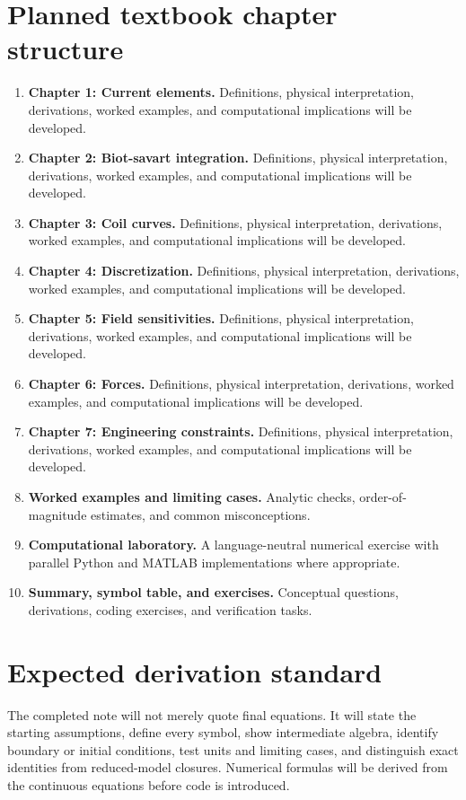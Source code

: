 \documentclass[11pt]{article}
\begin{document}
\section{Planned textbook chapter structure}
\begin{enumerate}[leftmargin=1.8em]
\item \textbf{Chapter 1: Current elements.} Definitions, physical interpretation, derivations, worked examples, and computational implications will be developed.
\item \textbf{Chapter 2: Biot-savart integration.} Definitions, physical interpretation, derivations, worked examples, and computational implications will be developed.
\item \textbf{Chapter 3: Coil curves.} Definitions, physical interpretation, derivations, worked examples, and computational implications will be developed.
\item \textbf{Chapter 4: Discretization.} Definitions, physical interpretation, derivations, worked examples, and computational implications will be developed.
\item \textbf{Chapter 5: Field sensitivities.} Definitions, physical interpretation, derivations, worked examples, and computational implications will be developed.
\item \textbf{Chapter 6: Forces.} Definitions, physical interpretation, derivations, worked examples, and computational implications will be developed.
\item \textbf{Chapter 7: Engineering constraints.} Definitions, physical interpretation, derivations, worked examples, and computational implications will be developed.
\item \textbf{Worked examples and limiting cases.} Analytic checks, order-of-magnitude estimates, and common misconceptions.
\item \textbf{Computational laboratory.} A language-neutral numerical exercise with parallel Python and MATLAB implementations where appropriate.
\item \textbf{Summary, symbol table, and exercises.} Conceptual questions, derivations, coding exercises, and verification tasks.
\end{enumerate}

\section{Expected derivation standard}
The completed note will not merely quote final equations. It will state the starting assumptions, define every symbol, show intermediate algebra, identify boundary or initial conditions, test units and limiting cases, and distinguish exact identities from reduced-model closures. Numerical formulas will be derived from the continuous equations before code is introduced.
\end{document}
